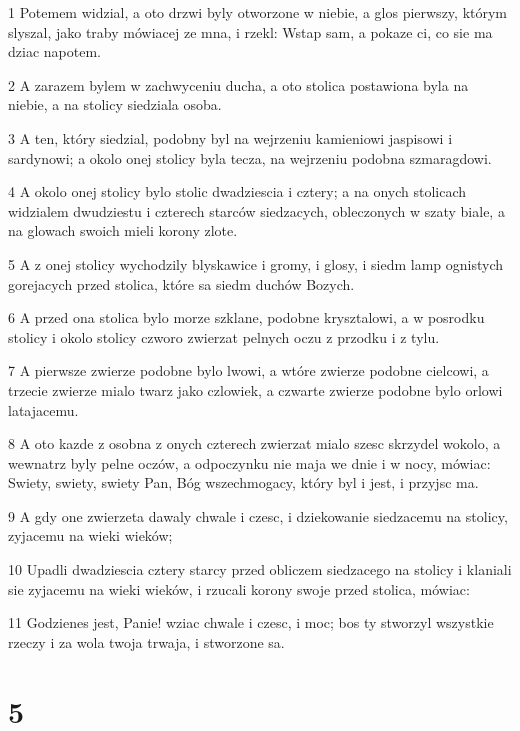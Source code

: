 \par 1 Potemem widzial, a oto drzwi byly otworzone w niebie, a glos pierwszy, którym slyszal, jako traby mówiacej ze mna, i rzekl: Wstap sam, a pokaze ci, co sie ma dziac napotem.
\par 2 A zarazem bylem w zachwyceniu ducha, a oto stolica postawiona byla na niebie, a na stolicy siedziala osoba.
\par 3 A ten, który siedzial, podobny byl na wejrzeniu kamieniowi jaspisowi i sardynowi; a okolo onej stolicy byla tecza, na wejrzeniu podobna szmaragdowi.
\par 4 A okolo onej stolicy bylo stolic dwadziescia i cztery; a na onych stolicach widzialem dwudziestu i czterech starców siedzacych, obleczonych w szaty biale, a na glowach swoich mieli korony zlote.
\par 5 A z onej stolicy wychodzily blyskawice i gromy, i glosy, i siedm lamp ognistych gorejacych przed stolica, które sa siedm duchów Bozych.
\par 6 A przed ona stolica bylo morze szklane, podobne krysztalowi, a w posrodku stolicy i okolo stolicy czworo zwierzat pelnych oczu z przodku i z tylu.
\par 7 A pierwsze zwierze podobne bylo lwowi, a wtóre zwierze podobne cielcowi, a trzecie zwierze mialo twarz jako czlowiek, a czwarte zwierze podobne bylo orlowi latajacemu.
\par 8 A oto kazde z osobna z onych czterech zwierzat mialo szesc skrzydel wokolo, a wewnatrz byly pelne oczów, a odpoczynku nie maja we dnie i w nocy, mówiac: Swiety, swiety, swiety Pan, Bóg wszechmogacy, który byl i jest, i przyjsc ma.
\par 9 A gdy one zwierzeta dawaly chwale i czesc, i dziekowanie siedzacemu na stolicy, zyjacemu na wieki wieków;
\par 10 Upadli dwadziescia cztery starcy przed obliczem siedzacego na stolicy i klaniali sie zyjacemu na wieki wieków, i rzucali korony swoje przed stolica, mówiac:
\par 11 Godzienes jest, Panie! wziac chwale i czesc, i moc; bos ty stworzyl wszystkie rzeczy i za wola twoja trwaja, i stworzone sa.

\chapter{5}

